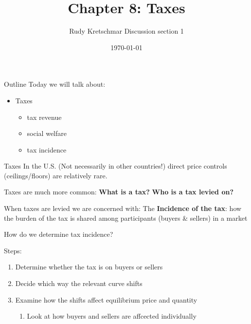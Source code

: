 \documentclass[compress]{beamer}
\title{Chapter 8: Taxes}
\author{Rudy Kretschmar
    Discussion section 1}
\date{\today}
\begin{document}
\begin{frame}
    \titlepage 
\end{frame}

\begin{frame}{Outline}
    Today we will talk about:
    \begin{itemize}
        \item Taxes
        \begin{itemize}
            \item tax revenue
            \item social welfare
            \item tax incidence
        \end{itemize}
    \end{itemize}
\end{frame}


\begin{frame}{Taxes}
In the U.S. (Not necessarily in other countries!) direct price controls (ceilings/floors) are relatively rare.

\medskip

Taxes are much more common: \textbf{What is a tax?} \textbf{Who is a tax levied on?}

\medskip

\begin{block}{When taxes are levied we are concerned with:}
    The \textbf{Incidence of the tax}: how the burden of the tax is shared among participants (buyers \& sellers) in a market
\end{block}
\end{frame}

\begin{frame}{How do we determine tax incidence?}
    \begin{block}{Steps:}
        \begin{enumerate}
            \item Determine whether the tax is on buyers or sellers
            \item Decide which way the relevant curve shifts
            \item Examine how the shifts affect equilibrium price and quantity
            \begin{enumerate}
                \item Look at how buyers and sellers are affcected individually
            \end{enumerate}
        \end{enumerate}
    \end{block}
\end{frame}
\end{document}
